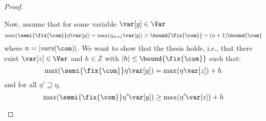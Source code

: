 \begin{proof}
\begin{inductive}
    Now, assume that for some variable \(\var[y] \in \Var\)
    \[\max(\semi{\fix{\com}} \eta \var[y]) = \max(\eta_{m+1} \var[y]) >
      \bound{\fix{\com}} = (n+1) \bound{\com}\]
    where \(n=|\mathit{vars}(\com)|\). 
    We want to show that the thesis holds, i.e., that there exist
    \(\var[z] \in \Var\) and \(h \in \mathbb{Z}\) with
    \(|h| \leq \bound{\fix{\com}}\) such that:
    \begin{equation}\label{eq:maxendmaxstartaxio}
      \max(\semi{\fix{\com}} \eta \var[y]) = \max(\eta \var[z]) + h
    \end{equation}
    and for all \(\eta' \sqsupseteq \eta\),
    \begin{equation}\label{eq:maxmiddlemaxendaxio}
      \max(\semi{\fix{\com}} \eta' \var[y]) \geq \max(\eta' \var[z]) + h
    \end{equation}
    

\end{inductive}
\end{proof}
